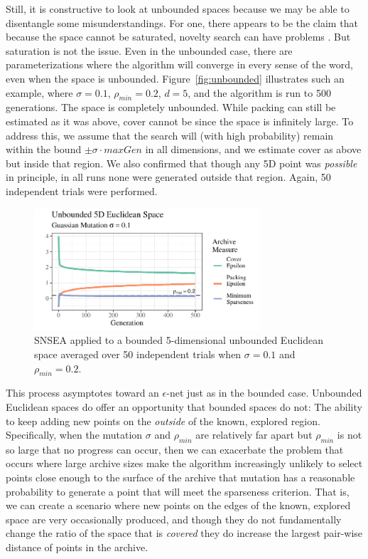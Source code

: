 \documentclass[twoside]{article}
\begin{document}
Still, it is constructive to look at unbounded spaces because we may be able to disentangle some misunderstandings.  For one, there appears to be the claim that because the space cannot be saturated, novelty search can have problems \citep{LehmanStanley2008ssls,Doncieux2019gecco}.  But saturation is not the issue.  Even in the unbounded case, there are parameterizations where the algorithm will converge in every sense of the word, even when the space is unbounded.  Figure~\ref{fig:unbounded} illustrates such an example, where $\sigma=0.1$, $\rho_{min}= 0.2$, $d=5$, and the algorithm is run to 500 generations.  The space is completely unbounded.  While packing can still be estimated as it was above, cover cannot be since the space is infinitely large.  To address this, we assume that the search will (with high probability) remain within the bound $\pm\sigma\cdot maxGen$ in all dimensions, and we estimate cover as above but inside that region.  We also confirmed that though any 5D point was \emph{possible} in principle, in all runs none were generated outside that region.  Again, 50 independent trials were performed.
%
\begin{figure}[h]
  \center\includegraphics[width=0.75\textwidth]{Figures/unbounded-s01-r02-NOPOP.pdf}
  \caption{\label{fig:unbounded:nopop:0102} SNSEA applied to a bounded 5-dimensional unbounded Euclidean space averaged over 50 independent trials when $\sigma=0.1$ and $\rho_{min}=0.2$.}
\end{figure}
%
This process asymptotes toward an $\epsilon$-net just as in the bounded case.  Unbounded Euclidean spaces do offer an opportunity that bounded spaces do not:  The ability to keep adding new points on the \emph{outside} of the known, explored region.  Specifically, when the mutation $\sigma$ and $\rho_{min}$ are relatively far apart but $\rho_{min}$ is not so large that no progress can occur, then we can exacerbate the problem that occurs where large archive sizes make the algorithm increasingly unlikely to select points close enough to the surface of the archive that mutation has a reasonable probability to generate a point that will meet the sparseness criterion.  That is, we can create a scenario where new points on the edges of the known, explored space are very occasionally produced, and though they do not fundamentally change the ratio of the space that is \emph{covered} they do increase the largest pair-wise distance of points in the archive.
\end{document}
